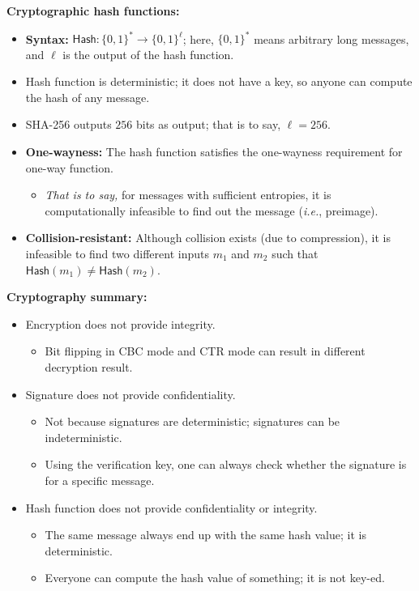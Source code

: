 \documentclass{article}
\newcommand{\parhead}[1]{\noindent \textbf{#1}}
\begin{document}
\clearpage
\parhead{Cryptographic hash functions:}
\begin{itemize}
    \item {\bf Syntax:} $\mathsf{Hash}: \{0,1\}^*\rightarrow\{0,1\}^\ell$; here, $\{0,1\}^*$ means arbitrary long messages, and $\ell$ is the output of the hash function.
    
    \item Hash function is deterministic; it does not have a key, so anyone can compute the hash of any message.
    
    \item SHA-256 outputs $256$ bits as output; that is to say, $\ell=256$.
    
    \item {\bf One-wayness:} The hash function satisfies the one-wayness requirement for one-way function.
    \begin{itemize}
        \item \emph{That is to say,} for messages with sufficient entropies, it is computationally infeasible to find out the message (\emph{i.e.}, preimage).
    \end{itemize}
    
    \item {\bf Collision-resistant:} Although collision exists (due to compression), it is infeasible to find two different inputs $m_1$ and $m_2$ such that $\mathsf{Hash}(m_1)\neq\mathsf{Hash}(m_2)$.
\end{itemize}

\parhead{Cryptography summary:}
\begin{itemize}
    \item Encryption does not provide integrity.
    \begin{itemize}
        \item Bit flipping in CBC mode and CTR mode can result in different decryption result.
    \end{itemize}
    
    \item Signature does not provide confidentiality.
    \begin{itemize}
        \item Not because signatures are deterministic; signatures can be indeterministic.
        \item Using the verification key, one can always check whether the signature is for a specific message. 
    \end{itemize}
    
    \item Hash function does not provide confidentiality or integrity.
    \begin{itemize}
        \item The same message always end up with the same hash value; it is deterministic.
        
        \item Everyone can compute the hash value of something; it is not key-ed. 
    \end{itemize}
    
\end{itemize}
\end{document}

